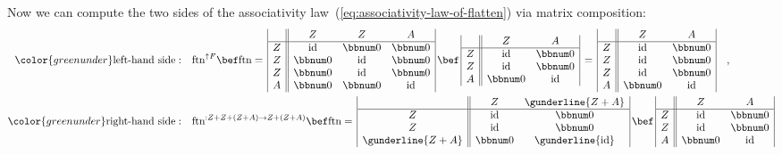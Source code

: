 Now we can compute the two sides of the associativity law~(\ref{eq:associativity-law-of-flatten})
via matrix composition:
\begin{align*}
{\color{greenunder}\text{left-hand side}:}\quad & \text{ftn}^{\uparrow F}\bef\text{ftn}=\,\begin{array}{|c||ccc|}
 & Z & Z & A\\
\hline Z & \text{id} & \bbnum 0 & \bbnum 0\\
Z & \bbnum 0 & \text{id} & \bbnum 0\\
Z & \bbnum 0 & \text{id} & \bbnum 0\\
A & \bbnum 0 & \bbnum 0 & \text{id}
\end{array}\,\bef\,\begin{array}{|c||cc|}
 & Z & A\\
\hline Z & \text{id} & \bbnum 0\\
Z & \text{id} & \bbnum 0\\
A & \bbnum 0 & \text{id}
\end{array}\,=\,\begin{array}{|c||cc|}
 & Z & A\\
\hline Z & \text{id} & \bbnum 0\\
Z & \text{id} & \bbnum 0\\
Z & \text{id} & \bbnum 0\\
A & \bbnum 0 & \text{id}
\end{array}\quad,\\
{\color{greenunder}\text{right-hand side}:}\quad & \text{ftn}^{:Z+Z+\left(Z+A\right)\rightarrow Z+\left(Z+A\right)}\bef\text{ftn}=\,\begin{array}{|c||cc|}
 & Z & \gunderline{Z+A}\\
\hline Z & \text{id} & \bbnum 0\\
Z & \text{id} & \bbnum 0\\
\gunderline{Z+A} & \bbnum 0 & \gunderline{\text{id}}
\end{array}\,\bef\,\begin{array}{|c||cc|}
 & Z & A\\
\hline Z & \text{id} & \bbnum 0\\
Z & \text{id} & \bbnum 0\\
A & \bbnum 0 & \text{id}
\end{array}
\end{align*}
